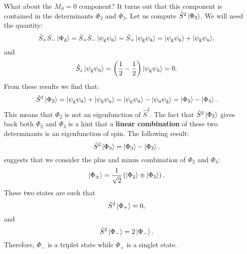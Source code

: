\documentclass[../Main/chem532-notes.tex]{subfiles}
\begin{document}
What about the $M_S = 0$ component?  It turns out that this component is contained in the determinants $\Phi_2$ and $\Phi_3$.
Let us compute $\hat{S}^2 \ket{\Phi_2}$. We will need the quantity:
\begin{equation}
\begin{split}
\hat{S}_{+} \hat{S}_{-} \ket{\Phi_2}
= \hat{S}_{+} \hat{S}_{-} \ket{\psi_{\mathrm{g}}\psi_{\bar{\mathrm{u}}}}
= \hat{S}_{+} \ket{\psi_{\bar{\mathrm{g}}}\psi_{\bar{\mathrm{u}}}}
= \ket{\psi_{\mathrm{g}}\psi_{\bar{\mathrm{u}}}} + \ket{\psi_{\bar{\mathrm{g}}}\psi_{\mathrm{u}}}
\end{split},
\end{equation}
and
\begin{equation}
\hat{S}_{z} \ket{\psi_{\mathrm{g}}\psi_{\bar{\mathrm{u}}}}
= \left(\frac{1}{2} - \frac{1}{2}\right) \ket{\psi_{\mathrm{g}}\psi_{\bar{\mathrm{u}}}} = 0.
\end{equation}
From these results we find that:
\begin{equation}
\hat{S}^2 \ket{\Phi_2} = \ket{\psi_{\mathrm{g}}\psi_{\bar{\mathrm{u}}}} + \ket{\psi_{\bar{\mathrm{g}}}\psi_{\mathrm{u}}} 
= \ket{\psi_{\mathrm{g}}\psi_{\bar{\mathrm{u}}}} - \ket{\psi_{\mathrm{u}}\psi_{\bar{\mathrm{g}}}} = 
\ket{\Phi_2} - \ket{\Phi_3}.
\end{equation}
This means that $\Phi_2$ is not an eigenfunction of $\hat{S}^2$.
The fact that $\hat{S}^2 \ket{\Phi_2}$ gives back both $\Phi_2$ and $\Phi_3$ is a hint that a \textbf{linear combination} of these two determinants is an eigenfunction of spin.
The following result:
\begin{equation}
\hat{S}^2 \ket{\Phi_3} = \ket{\Phi_3} - \ket{\Phi_2}.
\end{equation}
suggests that we consider the plus and minus combination of $\Phi_2$ and $\Phi_3$:
\begin{equation}
\ket{\Phi_\pm} = \frac{1}{\sqrt{2}} \left(  \ket{\Phi_2} \pm \ket{\Phi_3} \right).
\end{equation}
These two states are such that
\begin{equation}
\hat{S}^2 \ket{\Phi_+} = 0,
\end{equation}
and
\begin{equation}
\hat{S}^2 \ket{\Phi_{-}} = 2 \ket{\Phi_{-}}.
\end{equation}
Therefore, $\Phi_{-}$ is a triplet state while $\Phi_{+}$ is a singlet state.
\end{document}
